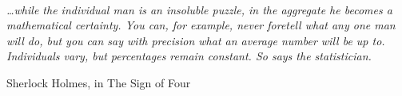 





\listfiles

\makeindex


\prefrontmatter

\maketitlepage


\frontmatter



\tableofcontents
\listoffigures
\listoftables

\cleardoublepage
\thispagestyle{empty}
~\vfill
\begin{fullwidth}
\begin{doublespace}
	\noindent\fontsize{14}{16}\selectfont\itshape
	\nohyphenation
\ldots while the individual man is an insoluble puzzle, in the aggregate he becomes a mathematical certainty. You can, for example, never foretell what any one man will do, but you can say with precision what an average number will be up to. Individuals vary, but percentages remain constant. So says the statistician.
  \begin{flushright}
Sherlock Holmes, in The Sign of Four
  \end{flushright}
\end{doublespace}
\end{fullwidth}
\vfill
\vfill

\mainmatter








\appendix





\backmatter
%
%

\printbibliography[]

